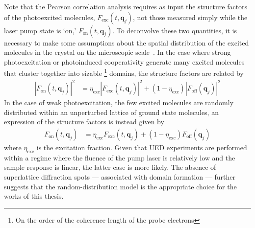 Note that the Pearson correlation analysis requires as input the structure factors
of the photoexcited molecules, $F_\text{exc}(t, \boldsymbol{q}_j)$,
not those measured simply while the laser pump state is `on,' $F_\text{on}(t, \boldsymbol{q}_j)$.
%
To deconvolve these two quantities, it is necessary to make some assumptions about
the spatial distribution of the excited molecules in the crystal
on the microscopic scale~\cite{CoppensBook, Coppens1998, Coppens2005, Reeuwijk2000}.
In the case where strong photoexcitation or photoinduced cooperativity
generate many excited molecules that cluster together into sizable%
\footnote{On the order of the coherence length of the probe electrons} domains,
the structure factors are related by
%
\begin{equation}
  \begin{aligned}
    |F_\text{on}(t, \boldsymbol{q}_j)|^2
      & = \eta_\text{exc} |F_\text{exc}(t, \boldsymbol{q}_j)|^2
        + \left( 1 - \eta_\text{exc} \right) |F_\text{off}(\boldsymbol{q}_j)|^2
  \end{aligned}
\end{equation}
%
In the case of weak photoexcitation, the few excited molecules are randomly distributed
within an unperturbed lattice of ground state molecules,
an expression of the structure factors is instead given by
%
\begin{equation}
  \begin{aligned}
    F_\text{on}(t, \boldsymbol{q}_j)
      & = \eta_\text{exc} F_\text{exc}(t, \boldsymbol{q}_j)
        + \left( 1 - \eta_\text{exc} \right) F_\text{off}(\boldsymbol{q}_j)
  \end{aligned}
  \label{eq: coppens}
\end{equation}
%
where $\eta_\text{exc}$ is the excitation fraction.
Given that UED experiments are performed within a regime where
the fluence of the pump laser is relatively low and the sample response is linear,
the latter case is more likely. The absence of superlattice diffraction spots ---
associated with domain formation --- further suggests that the random-distribution model
is the appropriate choice for the works of this thesis.

